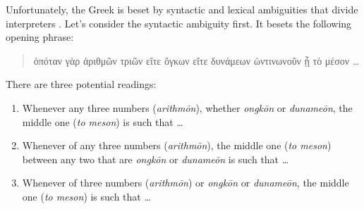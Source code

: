 Unfortunately, the Greek is beset by syntactic and lexical ambiguities that divide interpreters \citep{Prtichard:1990aa}. Let's consider the syntactic ambiguity first. It besets the following opening phrase:
\begin{quote}
{\sbl ὁπόταν γὰρ ἀριθμῶν τριῶν εἴτε ὄγκων εἴτε δυνάμεων ὡντινωνοῦν ᾖ τὸ μέσον \ldots}
\end{quote}
There are three potential readings:
\begin{enumerate}
	\item Whenever any three numbers (\emph{arithmōn}), whether \emph{ongkōn} or \emph{dunameōn}, the middle one (\emph{to meson}) is such that \ldots
	\item Whenever of any three numbers (\emph{arithmōn}), the middle one (\emph{to meson}) between any two that are \emph{ongkōn} or \emph{dunameōn} is such that \ldots
	\item Whenever of three numbers  (\emph{arithmōn}) or \emph{ongkōn} or \emph{dunameōn}, the middle one (\emph{to meson}) is such that \ldots
\end{enumerate}

